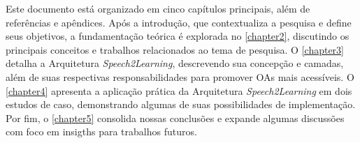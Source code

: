 Este documento está organizado em cinco capítulos principais, além de referências e apêndices. Após a introdução, que contextualiza a pesquisa e define seus objetivos, a fundamentação teórica é explorada no \autoref{chapter2}, discutindo os principais conceitos e trabalhos relacionados ao tema de pesquisa. O \autoref{chapter3} detalha a Arquitetura \textit{Speech2Learning}, descrevendo sua concepção e camadas, além de suas respectivas responsabilidades para promover OAs mais acessíveis. O \autoref{chapter4} apresenta a aplicação prática da Arquitetura \textit{Speech2Learning} em dois estudos de caso, demonstrando algumas de suas possibilidades de implementação. Por fim, o \autoref{chapter5} consolida nossas conclusões e expande algumas discussões com foco em insigths para trabalhos futuros.